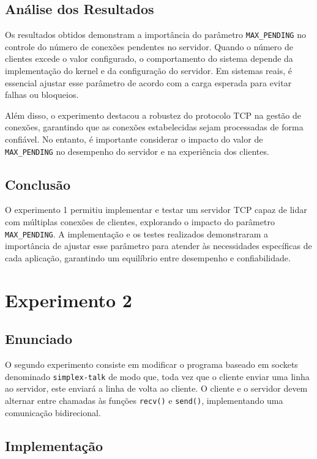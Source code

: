 \documentclass{article}
\begin{document}
\subsection{Análise dos Resultados}

Os resultados obtidos demonstram a importância do parâmetro \texttt{MAX\_PENDING} no controle do número de conexões pendentes no servidor. Quando o número de clientes excede o valor configurado, o comportamento do sistema depende da implementação do kernel e da configuração do servidor. Em sistemas reais, é essencial ajustar esse parâmetro de acordo com a carga esperada para evitar falhas ou bloqueios.

Além disso, o experimento destacou a robustez do protocolo TCP na gestão de conexões, garantindo que as conexões estabelecidas sejam processadas de forma confiável. No entanto, é importante considerar o impacto do valor de \texttt{MAX\_PENDING} no desempenho do servidor e na experiência dos clientes.

\subsection{Conclusão}

O experimento 1 permitiu implementar e testar um servidor TCP capaz de lidar com múltiplas conexões de clientes, explorando o impacto do parâmetro \texttt{MAX\_PENDING}. A implementação e os testes realizados demonstraram a importância de ajustar esse parâmetro para atender às necessidades específicas de cada aplicação, garantindo um equilíbrio entre desempenho e confiabilidade.

\section{Experimento 2}

\subsection{Enunciado}

O segundo experimento consiste em modificar o programa baseado em sockets denominado \texttt{simplex-talk} de modo que, toda vez que o cliente enviar uma linha ao servidor, este enviará a linha de volta ao cliente. O cliente e o servidor devem alternar entre chamadas às funções \texttt{recv()} e \texttt{send()}, implementando uma comunicação bidirecional.

\subsection{Implementação}
\end{document}
